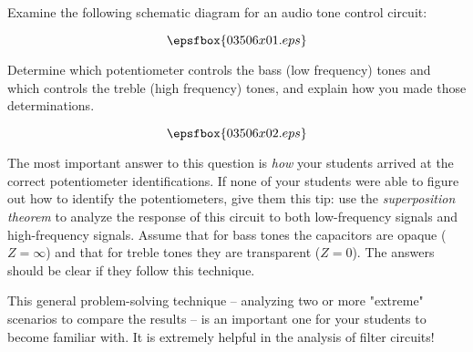 

Examine the following schematic diagram for an audio tone control circuit:

$$\epsfbox{03506x01.eps}$$

Determine which potentiometer controls the bass (low frequency) tones and which controls the treble (high frequency) tones, and explain how you made those determinations.







$$\epsfbox{03506x02.eps}$$







The most important answer to this question is {\it how} your students arrived at the correct potentiometer identifications.  If none of your students were able to figure out how to identify the potentiometers, give them this tip: use the {\it superposition theorem} to analyze the response of this circuit to both low-frequency signals and high-frequency signals.  Assume that for bass tones the capacitors are opaque ($Z = \infty$) and that for treble tones they are transparent ($Z = 0$).  The answers should be clear if they follow this technique.

This general problem-solving technique -- analyzing two or more "extreme" scenarios to compare the results -- is an important one for your students to become familiar with.  It is extremely helpful in the analysis of filter circuits!




